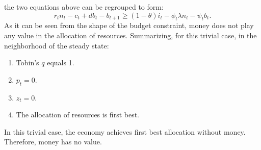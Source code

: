 \documentclass[12pt]{article}%
\begin{document}
the two equations above can be regrouped to form:
\begin{equation}
r_t n_t -c_t +d b_t -b_{t+1} \ge (1-\theta)i_t - \phi_t \lambda n_t - \psi_t b_t.
\end{equation}
As it can be seen from the shape of the budget constraint, money does not play
any value in the allocation of resources. Summarizing, for this trivial case, in
the neighborhood of the steady state:
  \begin{enumerate}
   \item Tobin's $q$ equals 1.
   \item $p_t = 0$.
   \item $z_t = 0$.
   \item The allocation of resources is first best.
\end{enumerate}
In this trivial case, the economy achieves first best allocation without money.
Therefore, money has no value.
\end{document}
